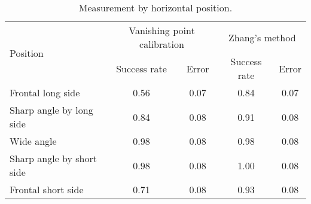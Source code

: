 \begin{table}[H]
\centering
\begin{tabular}{@{} l *4c @{}}
\toprule
\multirow{2}{*}{Position} & \multicolumn{2}{c}{Vanishing point calibration} & \multicolumn{2}{c}{Zhang's method}\\ 
\cmidrule(r){2-3}
\cmidrule(r){4-5}
& Success rate & Error & Success rate & Error \\
\midrule
 Frontal long side 			& 0.56 & 0.07 & 0.84 & 0.07 \\ 
 Sharp angle by long side  	& 0.84 & 0.08 & 0.91 & 0.08 \\
 Wide angle 				& 0.98 & 0.08 & 0.98 & 0.08 \\
 Sharp angle by short side 	& 0.98 & 0.08 & 1.00 & 0.08 \\
 Frontal short side 		& 0.71 & 0.08 & 0.93 & 0.08 \\
\bottomrule
 \end{tabular}
 \caption{Measurement by horizontal position.}
\label{table:key_measurement_by_position}
\end{table}